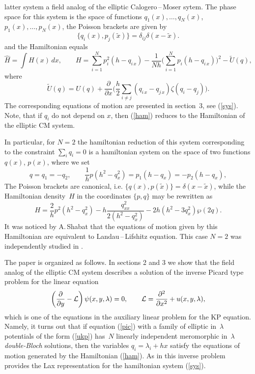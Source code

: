 \documentclass[a4paper,11pt]{article}
\newcommand{\p}{\partial}
\newcommand{\wt}{\widetilde}
\newcommand{\cL}{{\cal L}}
\theoremstyle{plain}
\theoremstyle{remark}
\begin{document}
latter system a field analog of the elliptic Calogero\,--\,Moser sytem.
The phase space for this system is the space of functions
$q_1(x),\dots,q_N(x)$, $p_1(x),\dots,p_N(x)$, the Poisson brackets are given by
$$
\{q_i(x),p_j(\tilde x)\}=\delta_{ij}\delta(x-\tilde x) .
$$
and the Hamiltonian equals
\begin{equation}\label{ham}
\widehat H=\int H(x)\,dx, \qquad
H= \sum_{i=1}^N p_i^2(h-q_{i\,x})-
\frac{1}{N h} \biggl( \sum_{i=1}^N p_i(h-q_{i\,x}) \biggr)^{\!2}-{\wt U}(q),
\end{equation}
where
$$
{\wt U}(q)=U(q)+\frac{\p}{\p x} \biggl(\frac{h}{2} \sum_{i\ne j}
(q_{i\,x}-q_{j\,x}) \zeta(q_i-q_j) \biggr) .
$$
The corresponding equations of motion are presented in section~3,
see (\ref{sys}).
Note, that if $q_i$ do not depend on $x$, then (\ref{ham})
reduces to the Hamiltonian of the elliptic CM system.

In particular, for $N=2$ the hamiltonian reduction of this system
corresponding to the constraint $\sum_{i} q_i=0$ is a hamiltonian system
on the space of two functions $q(x)$, $p(x)$, where we set
$$
q=q_1=-q_2,\qquad \frac{1}{h}p(h^2-q_x^2)=p_1(h-q_x)=-p_2(h-q_x),
$$
The Poisson brackets are canonical, i.e.
$\{q(x),p(\tilde x)\}=\delta(x-\tilde x)$,
while the Hamiltonian density~$H$ in the coordinates $\{p,q\}$ may be
rewritten as
$$
H=\frac{2}{h}p^2(h^2-q_x^2)-h\frac{q^2_{xx}}{2(h^2-q_x^2)}-
2h(h^2-3q_x^2)\wp(2q).
$$
It was noticed by A.\,Shabat that the equations of motion given by
this Hamiltonian are equivalent to Landau\,--\,Lifshitz equation.
This case $N=2$ was independently studied in \cite{loz}.

The paper is organized as follows.
In sections 2 and 3 we show that the field analog of the elliptic CM system
describes a solution of the inverse Picard type problem for the linear equation
\begin{equation}\label{pic}
\left(\frac{\p}{\p y}-\cL\right)\psi(x,y,\lambda)=0, \qquad
\cL=\frac{\p^2}{\p x^2}+u(x,y,\lambda),
\end{equation}
which is one of the equations in the auxiliary linear problem for
the KP equation.  Namely, it turns out that if equation (\ref{pic}) with
a family of elliptic in~$\lambda$ potentials of the form (\ref{ukp})
has~$N$ linearly independent meromorphic in~$\lambda$ {\it double-Bloch}
solutions, then the variables $q_i=\lambda_i+h x$ satisfy the equations
of motion generated by the Hamiltonian (\ref{ham}).
As in \cite{krelkp} this inverse problem provides the Lax representation
for the hamiltonian system (\ref{sys}).
\end{document}
